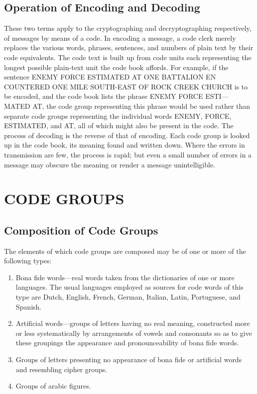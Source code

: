 \subsection{Operation of Encoding and Decoding}

These two terms apply to the cryptographing and decryptographing
respectively, of messages by means of a code. In encoding a message, a
code clerk merely replaces the various words, phrases, sentences, and
numbers of plain text by their code equivalents. The code text is built
up from code units each representing the longest possible plain-text unit
the code book affords. For example, if the sentence ENEMY FORCE
ESTIMATED AT ONE BATTALION EN COUNTERED ONE
MILE SOUTH-EAST OF ROCK CREEK CHURCH is to be
encoded, and the code book lists the phrase ENEMY FORCE ESTI—
MATED AT, the code group representing this phrase would be used
rather than separate code groups representing the individual words
ENEMY, FORCE, ESTIMATED, and AT, all of which might also
be present in the code. The process of decoding is the reverse of that
of encoding. Each code group is looked up in the code book, its meaning
found and written down. Where the errors in transmission are few, the
process is rapid; but even a small number of errors in a message may
obscure the meaning or render a message unintelligible.

\section{CODE GROUPS}

\subsection{Composition of Code Groups}

\mypara The elements of which code groups are composed may be of one or
more of the following types:
\begin{enumerate}

\item Bona ﬁde words—real words taken from the dictionaries of one
or more languages. The usual languages employed as sources
for code words of this type are Dutch, English, French,
German, Italian, Latin, Portuguese, and Spanish.

\item Artiﬁcial words—groups of letters having no real meaning,
constructed more or less systematically by arrangements of
vowels and consonants so as to give these groupings the appearance and pronounceability of bona ﬁde words.

\item Groups of letters presenting no appearance of bona ﬁde or artiﬁcial words and resembling cipher groups.

\item Groups of arabic ﬁgures.
\end{enumerate}

